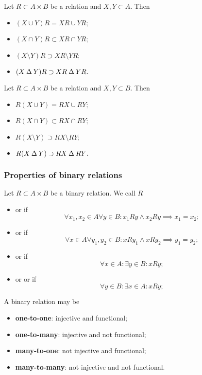 \begin{lemma} \label{lemma:imageRelation}
Let $R\subset A\times B$ be a relation and $X,Y\subset A$. Then
\begin{itemize}
\item $(X\cup Y)R = XR\cup YR$;
\item $(X\cap Y)R \subset XR\cap YR$;
\item $(X\setminus Y)R \supset XR\setminus YR$;
\item $(X\mathbin{\Delta} Y)R \supset XR\mathbin{\Delta} YR$.
\end{itemize}
\end{lemma}
\begin{lemma} \label{lemma:preimageRelation}
Let $R\subset A\times B$ be a relation and $X,Y\subset B$. Then
\begin{itemize}
\item $R(X\cup Y) = RX\cup RY$;
\item $R(X\cap Y) \subset RX\cap RY$;
\item $R(X\setminus Y) \supset RX\setminus RY$;
\item $R(X\mathbin{\Delta} Y) \supset RX\mathbin{\Delta} RY$.
\end{itemize}
\end{lemma}

\subsubsection{Properties of binary relations}
\begin{definition}
Let $R\subset A\times B$ be a binary relation. We call $R$
\begin{itemize}
\item {} or  if
\[ \forall x_1,x_2\in A\forall y\in B: x_1Ry \land x_2Ry \implies x_1=x_2; \]
\item {} or  if
\[ \forall x\in A\forall y_1,y_2\in B: xRy_1 \land xRy_2 \implies y_1=y_2; \]
\item {} or  if
\[ \forall x\in A:\exists y\in B: xRy; \]
\item {} or  or  if
\[ \forall y\in B:\exists x\in A: xRy; \]
\end{itemize}
\end{definition}
A binary relation may be
\begin{itemize}
\item \textbf{one-to-one}: injective and functional;
\item \textbf{one-to-many}: injective and not functional;
\item \textbf{many-to-one}: not injective and functional;
\item \textbf{many-to-many}: not injective and not functional.
\end{itemize}

